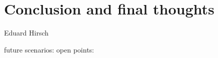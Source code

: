 \chapter{Conclusion and final thoughts}
\label{ch:conclusion}

\vspace{-1cm}
\begin{center}
Eduard Hirsch
\end{center}

future scenarios:
open points:
